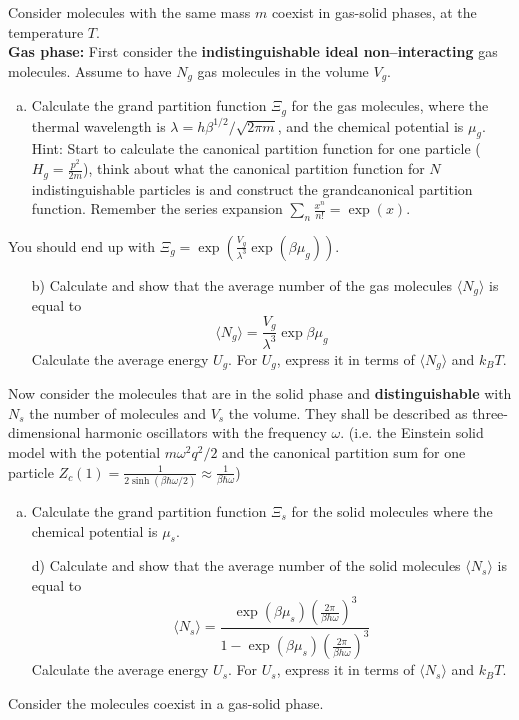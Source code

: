 \documentclass[12pt,a4paper]{article} %
\begin{document}
Consider molecules with the same mass $m$ coexist in gas-solid phases, at the temperature $T$. \\
\textbf{Gas phase:} First consider the \textbf{indistinguishable ideal non--interacting} gas molecules. Assume to have $N_g$ gas molecules in the volume $V_g$.
\begin{enumerate}[a)]
    \item Calculate the grand partition function $\Xi_g$ for the gas molecules, where the thermal wavelength is $\lambda = h \beta^{1/2}/\sqrt{2\pi m}$, and the chemical potential is $\mu_g$.\\ Hint: Start to calculate the canonical partition function for one particle ($H_g = \frac{p^2}{2m}$), think about what the canonical partition function for $N$ indistinguishable particles is and construct the grandcanonical partition function. Remember the series expansion $\sum_n \frac{x^n}{n!} = \exp(x)$.
    \end{enumerate}
    You should end up with $\Xi_g = \exp\left( \frac{V_g}{\lambda^3} \exp(\beta \mu_g)\right)$.
    \begin{enumerate}
    \item [b)]Calculate and show that the average number of the gas molecules $\langle N_g \rangle$ is equal to 
    $$\langle N_g \rangle = \frac{V_g}{\lambda^3}\exp{\beta\mu_g}$$
    Calculate the average energy $U_g$. For $U_g$, express it in terms of $\langle N_g \rangle$ and $k_B T$.
    \end{enumerate}
  Now consider the molecules that are in the solid phase and \textbf{distinguishable} with $N_s$ the number of molecules and  $V_s$ the volume. They shall be described as three-dimensional harmonic oscillators with the frequency $\omega$. (i.e. the Einstein solid model with the potential $m\omega^2 q^2/2$ and the canonical partition sum for one particle $Z_c(1) = \frac{1}{2\sinh(\beta \hbar \omega /2)} \approx \frac{1}{\beta \hbar \omega}$)
    \begin{enumerate}[c)]
    \item Calculate the grand partition function $\Xi_s$ for the solid molecules where the chemical potential is $\mu_s$. 
    \item[d)] Calculate and show that the average number of the solid molecules $\langle N_s \rangle$ is equal to 
    $$\langle N_s \rangle = \frac{\exp(\beta\mu_s)(\frac{2\pi}{\beta h \omega})^3}{1 - \exp(\beta\mu_s)(\frac{2\pi}{\beta h \omega})^3}$$
    Calculate the average energy $U_s$. For $U_s$, express it in terms of $\langle N_s \rangle$ and $k_B T$.
    \end{enumerate}
    Consider the molecules coexist in a gas-solid phase.
    
\end{document}
